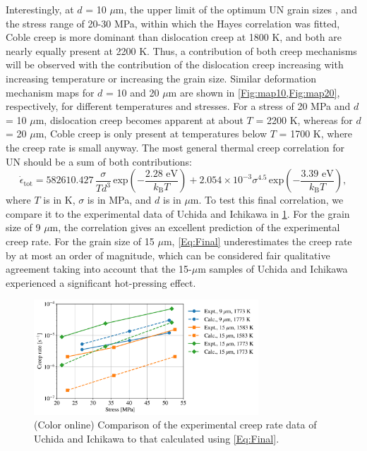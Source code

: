 \documentclass[preprint,12pt,sort&compress]{elsarticle} %
\newcommand{\?}{\stackrel{?}{=}}
\providecommand{\DIFaddbegin}{\protect\color{blue}} %
\providecommand{\DIFaddend}{\protect\color{black}} %
\providecommand{\DIFdelbegin}{\protect\color{red}} %
\providecommand{\DIFdelend}{\protect\color{black}} %
\newcommand{\DIFscaledelfig}{0.5}
\newlength{\DIFdelgraphicswidth} %
\newlength{\DIFdelgraphicsheight} %
\newcommand{\DIFaddincludegraphics}[2][]{{\color{blue}\fbox{\DIFOincludegraphics[#1]{#2}}}} %
\newcommand{\DIFdelincludegraphics}[2][]{%
\sbox{\DIFdelgraphicsbox}{\DIFOincludegraphics[#1]{#2}}%
\settoboxwidth{\DIFdelgraphicswidth}{\DIFdelgraphicsbox} %
\settoboxtotalheight{\DIFdelgraphicsheight}{\DIFdelgraphicsbox} %
\scalebox{\DIFscaledelfig}{%
\parbox[b]{\DIFdelgraphicswidth}{\usebox{\DIFdelgraphicsbox}\\[-\baselineskip] \rule{\DIFdelgraphicswidth}{0em}}\llap{\resizebox{\DIFdelgraphicswidth}{\DIFdelgraphicsheight}{%
\setlength{\unitlength}{\DIFdelgraphicswidth}%
\begin{picture}(1,1)%
\thicklines\linethickness{2pt} %
{\color[rgb]{1,0,0}\put(0,0){\framebox(1,1){}}}%
{\color[rgb]{1,0,0}\put(0,0){\line( 1,1){1}}}%
{\color[rgb]{1,0,0}\put(0,1){\line(1,-1){1}}}%
\end{picture}%
}\hspace*{3pt}}} %
} %
\DeclareRobustCommand{\DIFaddbegin}{\DIFOaddbegin \let\includegraphics\DIFaddincludegraphics} %
\DeclareRobustCommand{\DIFaddend}{\DIFOaddend \let\includegraphics\DIFOincludegraphics} %
\DeclareRobustCommand{\DIFdelbegin}{\DIFOdelbegin \let\includegraphics\DIFdelincludegraphics} %
\DeclareRobustCommand{\DIFdelend}{\DIFOaddend \let\includegraphics\DIFOincludegraphics} %
\begin{document}
Interestingly, at $d$ = 10 $\mu$m, the upper limit of the optimum UN grain sizes \cite{Johnson2018}, and the stress range of 20-30 MPa, within which the Hayes correlation was fitted, Coble creep is more dominant than dislocation creep at 1800 K, and both are nearly equally present at 2200 K. Thus, a contribution of both creep mechanisms will be observed with the contribution of the dislocation creep increasing with increasing temperature or increasing the grain size. Similar deformation mechanism maps for $d$ = 10 and 20 $\mu$m are shown in \cref{Fig:map10,Fig:map20}, respectively, for different temperatures and stresses. For a stress of 20 MPa and $d$ = 10 $\mu$m, dislocation creep becomes apparent at about $T$ = 2200 K, whereas for $d$ = 20 $\mu$m, Coble creep is only present at temperatures below $T$ = 1700 K, where the creep rate is small anyway. The most general thermal creep correlation for UN should be a sum of both contributions:
\DIFdelbegin %
\DIFdelend \DIFaddbegin \begin{equation}
    \Dot{\epsilon}_\mathrm{tot} = 582610.427 \, \frac{\sigma}{T d^3} \, \mathrm{exp} \! \left( - \frac{2.28 \text{ eV}}{k_\mathrm{B} T} \right) + 2.054 \times 10^{-3} \sigma^{4.5} \, \mathrm{exp} \! \left( - \frac{3.39 \text{ eV}}{k_\mathrm{B} T} \right),
    \label{Eq:Final}
\end{equation}\DIFaddend 
where $T$ is in K, $\sigma$ is in MPa, and $d$ is in $\mu$m. To test this final correlation, we compare it to the experimental data of Uchida and Ichikawa \cite{Uchida1973} in \cref{Fig:Final}. For the grain size of 9 $\mu$m, the correlation gives an excellent prediction of the experimental creep rate. For the grain size of 15 $\mu$m, \cref{Eq:Final} underestimates the creep rate by at most an order of magnitude, which can be considered fair qualitative agreement taking into account that the 15-$\mu$m samples of Uchida and Ichikawa \cite{Uchida1973} experienced a significant hot-pressing effect.

\begin{figure}[h!]
    \centering
    \includegraphics[width=0.75\textwidth]{Final.png}
    \caption{(Color online) Comparison of the experimental creep rate data of Uchida and Ichikawa \cite{Uchida1973} to that calculated using \cref{Eq:Final}.}
    \label{Fig:Final}
\end{figure}
\end{document}
